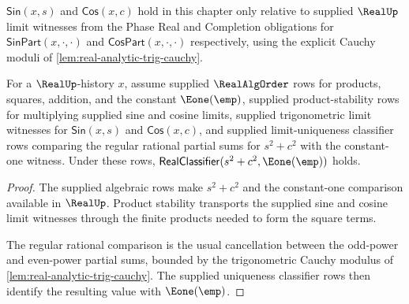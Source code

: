 \begin{definition}
\label{def:real-analytic-sin-cos}
$\mathsf{Sin}(x, s)$ and $\mathsf{Cos}(x, c)$ hold in this chapter only relative to supplied $\RealUp$ limit witnesses from the Phase Real and Completion obligations for $\mathsf{SinPart}(x, \cdot, \cdot)$ and $\mathsf{CosPart}(x, \cdot, \cdot)$ respectively, using the explicit Cauchy moduli of \autoref{lem:real-analytic-trig-cauchy}.
\end{definition}

\begin{theorem}
\label{thm:real-analytic-pythagorean}
For a $\RealUp$-history $x$, assume supplied $\RealAlgOrder$ rows for products, squares, addition, and the constant $\Eone(\emp)$, supplied product-stability rows for multiplying supplied sine and cosine limits, supplied trigonometric limit witnesses for $\mathsf{Sin}(x,s)$ and $\mathsf{Cos}(x,c)$, and supplied limit-uniqueness classifier rows comparing the regular rational partial sums for $s^2+c^2$ with the constant-one witness. Under these rows, $\mathsf{RealClassifier}(s^2 + c^2, \Eone(\emp))$ holds.
\end{theorem}
\begin{proof}
The supplied algebraic rows make $s^2+c^2$ and the constant-one comparison available in $\RealUp$. Product stability transports the supplied sine and cosine limit witnesses through the finite products needed to form the square terms.

The regular rational comparison is the usual cancellation between the odd-power and even-power partial sums, bounded by the trigonometric Cauchy modulus of \autoref{lem:real-analytic-trig-cauchy}. The supplied uniqueness classifier rows then identify the resulting value with $\Eone(\emp)$.
\end{proof}

